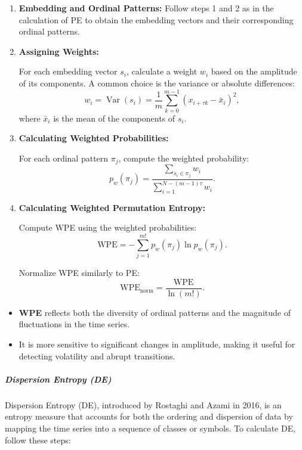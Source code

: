 \begin{enumerate} \item \textbf{Embedding and Ordinal Patterns:}
Follow steps 1 and 2 as in the calculation of PE to obtain the embedding vectors and their corresponding ordinal patterns.

\item \textbf{Assigning Weights:}

For each embedding vector $s_i$, calculate a weight $w_i$ based on the amplitude of its components. A common choice is the variance or absolute differences:
\begin{equation}
    w_i = \operatorname{Var}(s_i) = \frac{1}{m} \sum_{k=0}^{m-1} \left( x_{i+\tau k} - \bar{x}_i \right)^2,
\end{equation}
where $\bar{x}_i$ is the mean of the components of $s_i$.

\item \textbf{Calculating Weighted Probabilities:}

For each ordinal pattern $\pi_j$, compute the weighted probability:
\begin{equation}
    p_w(\pi_j) = \frac{\sum_{s_i \in \pi_j} w_i}{\sum_{i=1}^{N - (m -1)\tau} w_i}.
\end{equation}

\item \textbf{Calculating Weighted Permutation Entropy:}

Compute \ac{WPE} using the weighted probabilities:
\begin{equation}
    \mathrm{WPE} = - \sum_{j=1}^{m!} p_w(\pi_j) \ln p_w(\pi_j).
\end{equation}

Normalize WPE similarly to PE:
\begin{equation}
    \mathrm{WPE}_{\text{norm}} = \frac{\mathrm{WPE}}{\ln(m!)}.
\end{equation}
\end{enumerate}
\begin{itemize} \item \textbf{WPE} reflects both the diversity of ordinal patterns and the magnitude of fluctuations in the time series. \item It is more sensitive to significant changes in amplitude, making it useful for detecting volatility and abrupt transitions. \end{itemize}

\subparagraph{Dispersion Entropy (DE)}
Dispersion Entropy (DE), introduced by Rostaghi and Azami in 2016, is an entropy measure that accounts for both the ordering and dispersion of data by mapping the time series into a sequence of classes or symbols.
To calculate DE, follow these steps:

